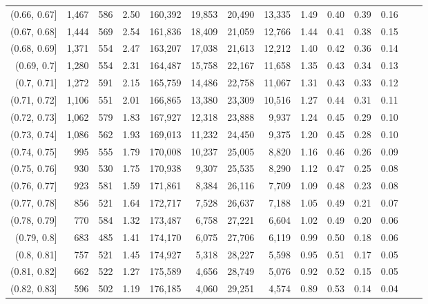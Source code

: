 \begin{tabular}{rrrrrrrrrrrrrr}
(0.66, 0.67]   &  1,467 &  586 &    2.50 &  160,392 &   19,853 &  20,490 &  13,335 &  1.49 &  0.40 &  0.39 &      0.16 \\
(0.67, 0.68]   &  1,444 &  569 &    2.54 &  161,836 &   18,409 &  21,059 &  12,766 &  1.44 &  0.41 &  0.38 &      0.15 \\
(0.68, 0.69]   &  1,371 &  554 &    2.47 &  163,207 &   17,038 &  21,613 &  12,212 &  1.40 &  0.42 &  0.36 &      0.14 \\
(0.69, 0.7]    &  1,280 &  554 &    2.31 &  164,487 &   15,758 &  22,167 &  11,658 &  1.35 &  0.43 &  0.34 &      0.13 \\
(0.7, 0.71]    &  1,272 &  591 &    2.15 &  165,759 &   14,486 &  22,758 &  11,067 &  1.31 &  0.43 &  0.33 &      0.12 \\
(0.71, 0.72]   &  1,106 &  551 &    2.01 &  166,865 &   13,380 &  23,309 &  10,516 &  1.27 &  0.44 &  0.31 &      0.11 \\
(0.72, 0.73]   &  1,062 &  579 &    1.83 &  167,927 &   12,318 &  23,888 &   9,937 &  1.24 &  0.45 &  0.29 &      0.10 \\
(0.73, 0.74]   &  1,086 &  562 &    1.93 &  169,013 &   11,232 &  24,450 &   9,375 &  1.20 &  0.45 &  0.28 &      0.10 \\
(0.74, 0.75]   &    995 &  555 &    1.79 &  170,008 &   10,237 &  25,005 &   8,820 &  1.16 &  0.46 &  0.26 &      0.09 \\
(0.75, 0.76]   &    930 &  530 &    1.75 &  170,938 &    9,307 &  25,535 &   8,290 &  1.12 &  0.47 &  0.25 &      0.08 \\
(0.76, 0.77]   &    923 &  581 &    1.59 &  171,861 &    8,384 &  26,116 &   7,709 &  1.09 &  0.48 &  0.23 &      0.08 \\
(0.77, 0.78]   &    856 &  521 &    1.64 &  172,717 &    7,528 &  26,637 &   7,188 &  1.05 &  0.49 &  0.21 &      0.07 \\
(0.78, 0.79]   &    770 &  584 &    1.32 &  173,487 &    6,758 &  27,221 &   6,604 &  1.02 &  0.49 &  0.20 &      0.06 \\
(0.79, 0.8]    &    683 &  485 &    1.41 &  174,170 &    6,075 &  27,706 &   6,119 &  0.99 &  0.50 &  0.18 &      0.06 \\
(0.8, 0.81]    &    757 &  521 &    1.45 &  174,927 &    5,318 &  28,227 &   5,598 &  0.95 &  0.51 &  0.17 &      0.05 \\
(0.81, 0.82]   &    662 &  522 &    1.27 &  175,589 &    4,656 &  28,749 &   5,076 &  0.92 &  0.52 &  0.15 &      0.05 \\
(0.82, 0.83]   &    596 &  502 &    1.19 &  176,185 &    4,060 &  29,251 &   4,574 &  0.89 &  0.53 &  0.14 &      0.04 \\

\end{tabular}
